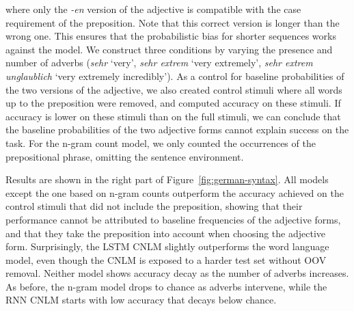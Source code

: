 where only the \emph{-en} version of the adjective is compatible with
the case requirement of the preposition. Note that this correct
version is longer than the wrong one. This ensures that the
probabilistic bias for shorter sequences works against the model.  We
construct three conditions by varying the presence and number of
adverbs (\emph{sehr} `very', \emph{sehr extrem} `very extremely',
\emph{sehr extrem unglaublich} `very extremely incredibly').  As a
control for baseline probabilities of the two versions of the
adjective, we also created control stimuli where all words up to the
preposition were removed, and computed accuracy on these stimuli.  If
accuracy is lower on these stimuli than on the full stimuli, we can
conclude that the baseline probabilities of the two adjective forms
cannot explain success on the task. For the n-gram count model, we
only counted the occurrences of the prepositional phrase, omitting the
sentence environment.

%
%
Results are shown in the right part of Figure~\ref{fig:german-syntax}. All models except the one
based on n-gram counts outperform the accuracy achieved on the control
stimuli that did not include the preposition, showing that their
performance cannot be attributed to baseline frequencies of the
adjective forms, and that they take the preposition into account when
choosing the adjective form.  Surprisingly, the LSTM CNLM slightly
outperforms the word language model, even though the CNLM is exposed
to a harder test set without OOV removal.  Neither model shows
accuracy decay as the number of adverbs increases.  As before, the
n-gram model drops to chance as adverbs intervene, while the RNN CNLM
starts with low accuracy that decays below chance.


